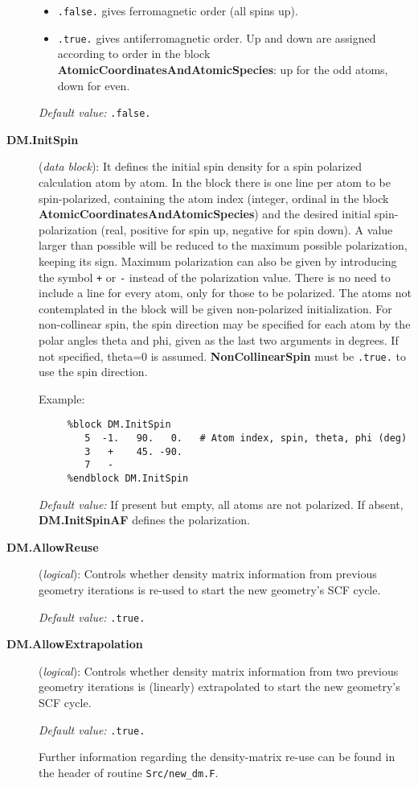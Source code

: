 \documentclass[11pt]{article}
\begin{document}
\begin{description}
\begin{itemize}
\item {\tt .false.} gives ferromagnetic order (all spins up).
\item {\tt .true.} gives antiferromagnetic order. Up and down are
assigned according to order in the block 
{\bf AtomicCoordinatesAndAtomicSpecies}: up for the odd atoms, down for even.
\end{itemize}

{\it Default value:} {\tt .false.}


\item[{\bf DM.InitSpin}] ({\it data block}): 
 It defines the
initial spin density for a spin polarized calculation atom by atom.
In the block there is one line per atom to be spin-polarized, 
containing the atom index (integer, ordinal in the block
{\bf AtomicCoordinatesAndAtomicSpecies}) and the desired
initial spin-polarization (real, positive for spin up, negative for
spin down). A value larger than possible will be reduced
to the maximum possible polarization, keeping its sign. 
Maximum polarization can also be given by introducing the
symbol {\tt +} or {\tt -} instead of the polarization value.
There is no need to include a line for every atom, only for
those to be polarized. The atoms not contemplated in the block will
be given non-polarized initialization.
For non-collinear spin, the spin direction may be specified for
each atom by the polar angles theta and phi, given as the last
two arguments in degrees. If not specified, theta=0 is assumed.
{\bf NonCollinearSpin} must be {\tt .true.} to use the spin direction.

Example:

\begin{verbatim}
     %block DM.InitSpin
        5  -1.   90.   0.   # Atom index, spin, theta, phi (deg)
        3   +    45. -90.
        7   -
     %endblock DM.InitSpin
\end{verbatim}

{\it Default value:} If present but empty, all atoms are not polarized. 
If absent, {\bf DM.InitSpinAF} defines the polarization.

\item[{\bf DM.AllowReuse}] ({\it logical}):
Controls whether density matrix information from previous geometry 
iterations is re-used to start the new geometry's SCF cycle.

{\it Default value:} {\tt .true.}

\item[{\bf DM.AllowExtrapolation}] ({\it logical}):
Controls whether density matrix information from two previous geometry 
iterations is (linearly) extrapolated to start the new geometry's SCF cycle.

{\it Default value:} {\tt .true.}

Further information regarding the density-matrix re-use can be found
in the header of routine {\tt Src/new\_dm.F}.

\end{description}
\end{document}
